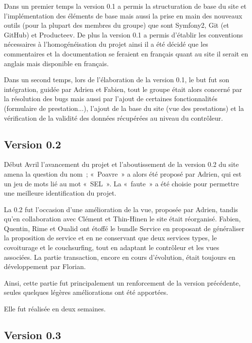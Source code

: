 Dans un premier temps la version 0.1 a permis la structuration de base du site et l'implémentation des éléments de base mais aussi la prise en main des nouveaux outils (pour la plupart des membres du groupe) que sont Symfony2, Git (et GitHub) et Producteev. De plus la version 0.1 a permis d'établir les conventions nécessaires à l'homogénéisation du projet ainsi il a été décidé que les commentaires et la documentation se feraient en français quant au site il serait en anglais mais disponible en français.

Dans un second temps, lors de l'élaboration de la version 0.1, le but fut son intégration, guidée par Adrien et Fabien, tout le groupe était alors concerné par la résolution des bugs mais aussi par l'ajout de certaines fonctionnalités (formulaire de prestation...), l'ajout de la base du site (vue des prestations) et la vérification de la validité des données récupérées au niveau du contrôleur.

\subsection{Version 0.2}

Début Avril l'avancement du projet et l'aboutissement de la version 0.2 du site amena la question du nom~; «~Poavre~» a alors été proposé par Adrien, qui est un jeu de mots lié au mot «~SEL~». La «~faute~» a été choisie pour permettre une meilleure identification du projet.

La 0.2 fut l'occasion d'une amélioration de la vue, proposée par Adrien, tandis qu'en collaboration avec Clément et Thin-Hinen le site était réorganisé. Fabien, Quentin, Rime et Oualid ont étoffé le bundle Service en proposant de généraliser la proposition de service et en ne conservant que deux services types, le covoiturage et le couchsurfing, tout en adaptant le contrôleur et les vues associées.
La partie transaction, encore en cours d'évolution, était toujours en développement par Florian.

Ainsi, cette partie fut principalement un renforcement de la version précédente, seules quelques légères améliorations ont été apportées.

Elle fut réalisée en deux semaines.

\subsection{Version 0.3}

